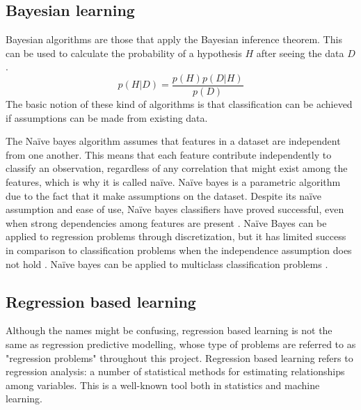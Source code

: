 
	\subsection{Bayesian learning}
		Bayesian algorithms are those that apply the Bayesian inference theorem. This can be used to calculate the probability of a hypothesis $H$ after seeing the data $D$.
		\begin{equation} \label{eq:bayes}
			p(H|D) = \frac{p(H)p(D|H)}{p(D)}
		\end{equation} 
	The basic notion of these kind of algorithms is that classification can be achieved if assumptions can be made from existing data. %

	The Naïve bayes algorithm assumes that features in a dataset are independent from one another. This means that each feature contribute independently to classify an observation, regardless of any correlation that might exist among the features, which is why it is called naïve. Naïve bayes is a parametric algorithm due to the fact that it make assumptions on the dataset. Despite its naïve assumption and ease of use, Naïve bayes classifiers have proved successful, even when strong dependencies among features are present \cite{ARTICLE:13, IP:4}. Naïve Bayes can be applied to regression problems through discretization, but it has limited success in comparison to classification problems when the independence assumption does not hold \cite{ARTICLE:14}. Naïve bayes can be applied to multiclass classification problems \cite{ARTICLE:17}. 

	 
	\subsection{Regression based learning} \label{sec:reg_based_learning}
		Although the names might be confusing, regression based learning is not the same as regression predictive modelling, whose type of problems are referred to as "regression problems" throughout this project. Regression based learning refers to regression analysis: a number of statistical methods for estimating relationships among variables. This is a well-known tool both in statistics and machine learning. 

